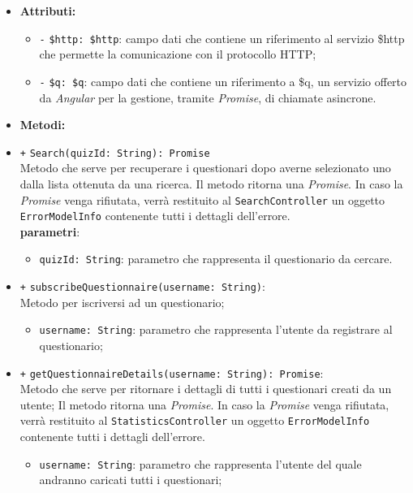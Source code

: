 \begin{itemize}
\begin{itemize}
	\end{itemize}
	\item \textbf{Attributi:}
	\begin{itemize}
		\item \texttt{-} \texttt{\$http: \$http}: campo dati che contiene un riferimento al servizio \$http che permette la comunicazione con il protocollo HTTP;
		\item \texttt{-} \texttt{\$q: \$q}: campo dati che contiene un riferimento a \$q, un servizio offerto da \textit{Angular} per la gestione, tramite \textit{Promise}, di chiamate asincrone.
	\end{itemize}
	\item \textbf{Metodi:} \\
	\item \texttt{+} \texttt{Search(quizId: String): Promise} \\Metodo che serve per recuperare i questionari dopo averne selezionato uno dalla lista ottenuta da una ricerca. Il metodo ritorna una \textit{Promise}. In caso la \textit{Promise} venga rifiutata, verrà restituito al \texttt{SearchController} un oggetto \texttt{ErrorModelInfo} contenente tutti i dettagli dell'errore. \\
	\textbf{parametri}:
	\begin{itemize}
		\item \texttt{quizId: String}: parametro che rappresenta il questionario da cercare.
	\end{itemize}
	\item \texttt{+} \texttt{subscribeQuestionnaire(username: String)}: \\Metodo per iscriversi ad un questionario;
	\begin{itemize}
		\item \texttt{username: String}: parametro che rappresenta l'utente da registrare al questionario;
	\end{itemize}
	\item \texttt{+} \texttt{getQuestionnaireDetails(username: String): Promise}: \\Metodo che serve per ritornare i dettagli di tutti i questionari creati da un utente; Il metodo ritorna una \textit{Promise}. In caso la \textit{Promise} venga rifiutata, verrà restituito al \texttt{StatisticsController} un oggetto \texttt{ErrorModelInfo} contenente tutti i dettagli dell'errore. \\ 
	\begin{itemize}
		\item \texttt{username: String}: parametro che rappresenta l'utente del quale andranno caricati tutti i questionari;

\end{itemize}
\end{itemize}
